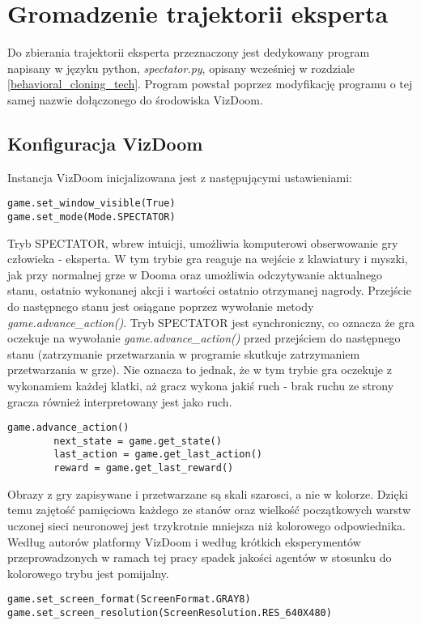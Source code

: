\section{Gromadzenie trajektorii eksperta}

Do zbierania trajektorii eksperta przeznaczony jest dedykowany program napisany w języku python, \textit{spectator.py}, opisany wcześniej w rozdziale \ref{behavioral_cloning_tech}. Program powstał poprzez modyfikację programu o tej samej nazwie dołączonego do środowiska VizDoom.

\subsection{Konfiguracja VizDoom}
Instancja VizDoom inicjalizowana jest z następującymi ustawieniami:

\begin{lstlisting}[language=iPython]
game.set_window_visible(True)
game.set_mode(Mode.SPECTATOR)
\end{lstlisting}

Tryb SPECTATOR, wbrew intuicji, umożliwia komputerowi obserwowanie gry człowieka - eksperta. W tym trybie gra reaguje na wejście z klawiatury i myszki, jak przy normalnej grze w Dooma oraz umożliwia odczytywanie aktualnego stanu, ostatnio wykonanej akcji i wartości ostatnio otrzymanej nagrody. Przejście do następnego stanu jest osiągane poprzez wywołanie metody \textit{game.advance\_action()}. Tryb SPECTATOR jest synchroniczny, co oznacza że gra oczekuje na wywołanie \textit{game.advance\_action()} przed przejściem do następnego stanu (zatrzymanie przetwarzania w programie skutkuje zatrzymaniem przetwarzania w grze). Nie oznacza to jednak, że w tym trybie gra oczekuje z wykonamiem każdej klatki, aż gracz wykona jakiś ruch - brak ruchu ze strony gracza również interpretowany jest jako ruch.

\begin{lstlisting}[language=iPython]
 	game.advance_action()
        next_state = game.get_state()
        last_action = game.get_last_action()
        reward = game.get_last_reward()
\end{lstlisting}

Obrazy z gry zapisywane i przetwarzane są skali szarosci, a nie w kolorze. Dzięki temu zajętość pamięciowa każdego ze stanów oraz wielkość początkowych warstw uczonej sieci neuronowej jest trzykrotnie mniejsza niż kolorowego odpowiednika. Według autorów platformy VizDoom i według krótkich eksperymentów przeprowadzonych w ramach tej pracy spadek jakości agentów w stosunku do kolorowego trybu jest pomijalny.
\begin{lstlisting}[language=iPython]
game.set_screen_format(ScreenFormat.GRAY8)
game.set_screen_resolution(ScreenResolution.RES_640X480)
\end{lstlisting}


